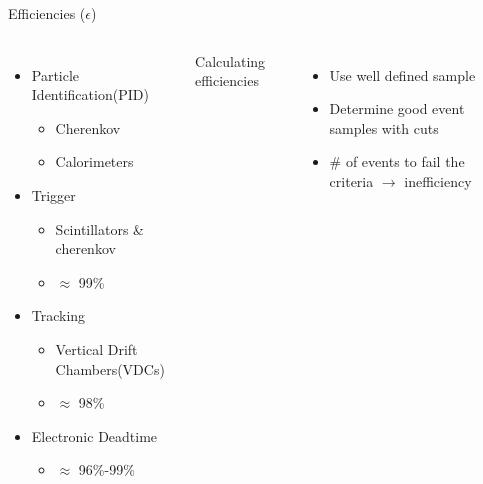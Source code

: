 \documentclass[12pt,usenames,dvipsnames]{beamer}
\begin{document}
\begin{frame}
\begin{block}{Efficiencies ($\epsilon$)}
	\begin{columns}
		
		\begin{itemize}
			\item Particle Identification(PID) 
			\begin{itemize}
				\item Cherenkov
				\item Calorimeters
			\end{itemize}
			\item Trigger
			\begin{itemize}
				\item Scintillators \& cherenkov
				\item $\approx$ 99\%
			\end{itemize}
			\item Tracking
			\begin{itemize}
				\item Vertical Drift Chambers(VDCs)
				\item $\approx$ 98\%
			\end{itemize}
			\item Electronic Deadtime
			\begin{itemize}
				\item $\approx$ 96\%-99\%
			\end{itemize}
		\end{itemize}
		Calculating efficiencies
		\begin{itemize}
			\item Use well defined sample
			\item Determine good event samples with cuts
			\item \# of events to fail the criteria $\rightarrow$ inefficiency 
		\end{itemize}
		
	\end{columns}
\end{block}
\end{frame}
\end{document}
